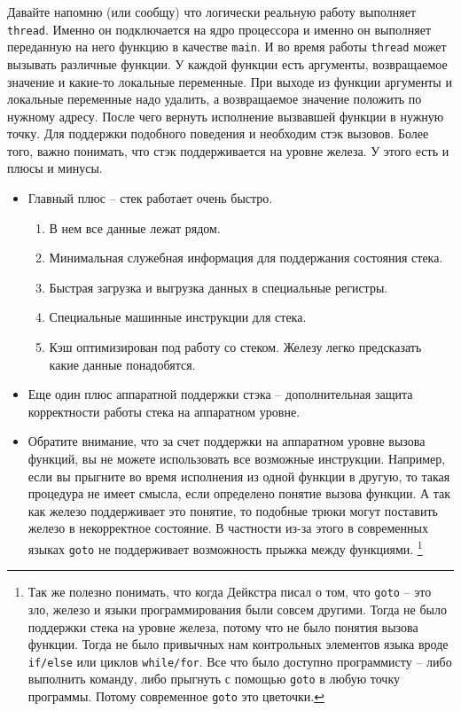 \documentclass{article}
\begin{document}
Давайте напомню (или сообщу) что логически реальную работу выполняет \verb"thread".
Именно он подключается на ядро процессора и именно он выполняет переданную на него функцию в качестве \verb"main".
И во время работы \verb"thread" может вызывать различные функции.
У каждой функции есть аргументы, возвращаемое значение и какие-то локальные переменные.
При выходе из функции аргументы и локальные переменные надо удалить, а возвращаемое значение положить по нужному адресу.
После чего вернуть исполнение вызвавшей функции в нужную точку.
Для поддержки подобного поведения и необходим стэк вызовов.
Более того, важно понимать, что стэк поддерживается на уровне железа.
У этого есть и плюсы и минусы.
\begin{itemize}
\item Главный плюс -- стек работает очень быстро.
\begin{enumerate}
\item В нем все данные лежат рядом.

\item Минимальная служебная информация для поддержания состояния стека.

\item Быстрая загрузка и выгрузка данных в специальные регистры.

\item Специальные машинные инструкции для стека.

\item Кэш оптимизирован под работу со стеком.
Железу легко предсказать какие данные понадобятся.
\end{enumerate}

\item Еще один плюс аппаратной поддержки стэка -- дополнительная защита корректности работы стека на аппаратном уровне.

\item Обратите внимание, что за счет поддержки на аппаратном уровне вызова функций, вы не можете использовать все возможные инструкции.
Например, если вы прыгните во время исполнения из одной функции в другую, то такая процедура не имеет смысла, если определено понятие вызова функции.
А так как железо поддерживает это понятие, то подобные трюки могут поставить железо в некорректное состояние.
В частности из-за этого в современных языках \verb"goto" не поддерживает возможность прыжка между функциями.%
\footnote{Так же полезно понимать, что когда Дейкстра писал о том, что \verb"goto" -- это зло, железо и языки программирования были совсем другими.
Тогда не было поддержки стека на уровне железа, потому что не было понятия вызова функции.
Тогда не было привычных нам контрольных элементов языка вроде \verb"if/else" или циклов \verb"while/for".
Все что было доступно программисту -- либо выполнить команду, либо прыгнуть с помощью \verb"goto" в любую точку программы.
Потому современное \verb"goto" это цветочки.}%


\end{itemize}
\end{document}
